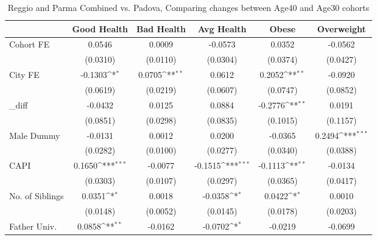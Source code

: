 \begin{table}[htbp]\centering
\def\sym#1{\ifmmode^{#1}\else\(^{#1}\)\fi}
\caption{Reggio and Parma Combined vs. Padova, Comparing changes between Age40 and Age30 cohorts}
\begin{tabular}{l*{5}{c}}
\toprule
            &\multicolumn{1}{c}{Good Health}&\multicolumn{1}{c}{Bad Health}&\multicolumn{1}{c}{Avg Health}&\multicolumn{1}{c}{Obese}&\multicolumn{1}{c}{Overweight}\\
\midrule
Cohort FE   &      0.0546         &      0.0009         &     -0.0573         &      0.0352         &     -0.0562         \\
            &    (0.0310)         &    (0.0110)         &    (0.0304)         &    (0.0374)         &    (0.0427)         \\
\addlinespace
City FE     &     -0.1303\sym{*}  &      0.0705\sym{**} &      0.0612         &      0.2052\sym{**} &     -0.0920         \\
            &    (0.0619)         &    (0.0219)         &    (0.0607)         &    (0.0747)         &    (0.0852)         \\
\addlinespace
\_diff       &     -0.0432         &      0.0125         &      0.0884         &     -0.2776\sym{**} &      0.0191         \\
            &    (0.0851)         &    (0.0298)         &    (0.0835)         &    (0.1015)         &    (0.1157)         \\
\addlinespace
Male Dummy  &     -0.0131         &      0.0012         &      0.0200         &     -0.0365         &      0.2494\sym{***}\\
            &    (0.0282)         &    (0.0100)         &    (0.0277)         &    (0.0340)         &    (0.0388)         \\
\addlinespace
CAPI        &      0.1650\sym{***}&     -0.0077         &     -0.1515\sym{***}&     -0.1113\sym{**} &     -0.0134         \\
            &    (0.0303)         &    (0.0107)         &    (0.0297)         &    (0.0365)         &    (0.0417)         \\
\addlinespace
No. of Siblings&      0.0351\sym{*}  &      0.0018         &     -0.0358\sym{*}  &      0.0422\sym{*}  &      0.0010         \\
            &    (0.0148)         &    (0.0052)         &    (0.0145)         &    (0.0178)         &    (0.0203)         \\
\addlinespace
Father Univ.&      0.0858\sym{**} &     -0.0162         &     -0.0702\sym{*}  &     -0.0219         &     -0.0699         \\

\end{tabular}
\end{table}
